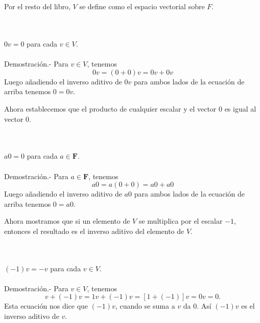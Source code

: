     \begin{mynot}[$\textbf{V}$]\;\\\\
	Por el resto del libro, $V$ se define como el espacio vectorial sobre $F$.
    \end{mynot}

\begin{myteo}\;\\\\
    $0v=0$ para cada $v\in V$.\\\\
	Demostración.-\; Para $v\in V$, tenemos
	$$0v=(0+0)v=0v+0v$$
	Luego añadiendo el inverso aditivo de $0v$ para ambos lados de la ecuación de arriba tenemos $0=0v$. 
\end{myteo}
\vspace{0.3cm}

Ahora  establecemos que el producto de cualquier escalar y el vector $0$ es igual al vector $0$.\\

\begin{myteo}\;\\\\
    $a0=0$ para cada $a\in \textbf{F}$.\\\\
	Demostración.-\; Para $a\in \textbf{F}$, tenemos 
	$$a0=a(0+0)=a0+a0$$
	Luego añadiendo el inverso aditivo de $a0$ para ambos lados de la ecuación de arriba tenemos $0=a0$. 
\end{myteo}
\vspace{0.3cm}

Ahora mostramos que si un elemento de $V$ se multiplica por el escalar $-1$, entonces el resultado es el inverso aditivo del elemento de $V$.\\

\begin{myteo}\;\\\\
    $(-1)v=-v$ para cada $v\in V$.\\\\
    	Demostración.-\; Para $v\in V$, tenemos
	$$v+(-1)v=1v+(-1)v=[1+(-1)]v=0v=0.$$
	Esta ecuación nos dice que $(-1)v$, cuando se suma a $v$ da $0$. Así $(-1)v$ es el inverso aditivo de $v$. 
\end{myteo}
\vspace{0.5cm}


